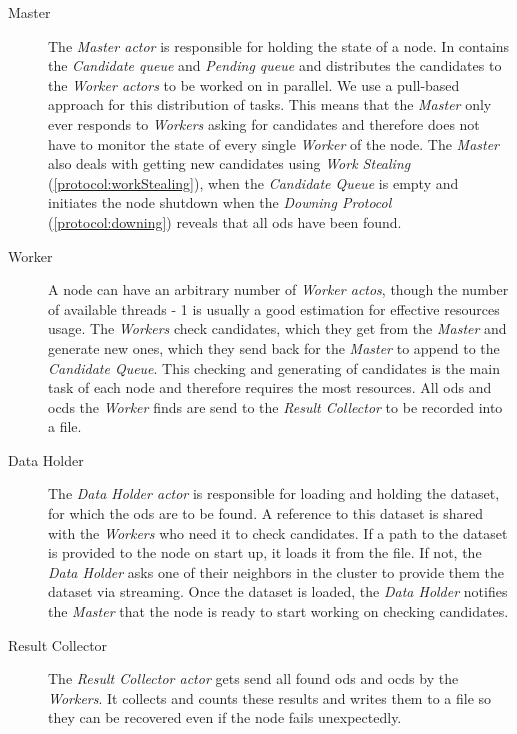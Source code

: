 \begin{description}
  \item[Master]
  The \emph{Master actor} is responsible for holding the state of a node.
  In contains the \emph{Candidate queue} and \emph{Pending queue} and distributes the candidates to the \emph{Worker actors} to be worked on in parallel. 
  We use a pull-based approach for this distribution of tasks.
  This means that the \emph{Master} only ever responds to \emph{Workers} asking for candidates and therefore does not have to monitor the state of every single \emph{Worker} of the node.
  The \emph{Master} also deals with getting new candidates using \emph{Work Stealing} (\ref{protocol:workStealing}), when the \emph{Candidate Queue} is empty and initiates the node shutdown when the \emph{Downing Protocol} (\ref{protocol:downing}) reveals that all \glspl{od} have been found.
  
  \item[Worker]
  A node can have an arbitrary number of \emph{Worker actos}, though the number of available threads - 1 is usually a good estimation for effective resources usage.
  The \emph{Workers} check candidates, which they get from the \emph{Master} and generate new ones, which they send back for the \emph{Master} to append to the \emph{Candidate Queue}.
  This checking and generating of candidates is the main task of each node and therefore requires the most resources.
  All \glspl{od} and \glspl{ocd} the \emph{Worker} finds are send to the \emph{Result Collector} to be recorded into a file. 
  
  \item[Data Holder]
  The \emph{Data Holder actor} is responsible for loading and holding the dataset, for which the \glspl{od} are to be found. 
  A reference to this dataset is shared with the \emph{Workers} who need it to check candidates.
  If a path to the dataset is provided to the node on start up, it loads it from the file.
  If not, the \emph{Data Holder} asks one of their neighbors in the cluster to provide them the dataset via streaming.
  Once the dataset is loaded, the \emph{Data Holder} notifies the \emph{Master} that the node is ready to start working on checking candidates. 
  
  \item[Result Collector]
  The \emph{Result Collector actor} gets send all found \glspl{od} and \glspl{ocd} by the \emph{Workers}.
  It collects and counts these results and writes them to a file so they can be recovered even if the node fails unexpectedly. 
  

\end{description}

